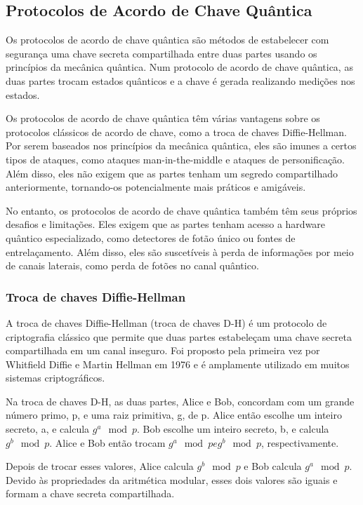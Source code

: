 \subsection{Protocolos de Acordo de Chave Quântica}

Os protocolos de acordo de chave quântica são métodos de estabelecer com segurança uma chave secreta compartilhada entre duas partes usando os princípios da mecânica quântica. Num protocolo de acordo de chave quântica, as duas partes trocam estados quânticos e a chave é gerada realizando medições nos estados.

Os protocolos de acordo de chave quântica têm várias vantagens sobre os protocolos clássicos de acordo de chave, como a troca de chaves Diffie-Hellman. Por serem baseados nos princípios da mecânica quântica, eles são imunes a certos tipos de ataques, como ataques man-in-the-middle e ataques de personificação. Além disso, eles não exigem que as partes tenham um segredo compartilhado anteriormente, tornando-os potencialmente mais práticos e amigáveis.

No entanto, os protocolos de acordo de chave quântica também têm seus próprios desafios e limitações. Eles exigem que as partes tenham acesso a hardware quântico especializado, como detectores de fotão único ou fontes de entrelaçamento. Além disso, eles são suscetíveis à perda de informações por meio de canais laterais, como perda de fotões no canal quântico.

\subsubsection{Troca de chaves Diffie-Hellman}

A troca de chaves Diffie-Hellman (troca de chaves D-H) é um protocolo de criptografia clássico que permite que duas partes estabeleçam uma chave secreta compartilhada em um canal inseguro. Foi proposto pela primeira vez por Whitfield Diffie e Martin Hellman em 1976 e é amplamente utilizado em muitos sistemas criptográficos.

Na troca de chaves D-H, as duas partes, Alice e Bob, concordam com um grande número primo, p, e uma raiz primitiva, g, de p. Alice então escolhe um inteiro secreto, a, e calcula \(g^a \mod p\). Bob escolhe um inteiro secreto, b, e calcula \(g^b \mod p\). Alice e Bob então trocam \(g^a \mod p e g^b \mod p\), respectivamente.

Depois de trocar esses valores, Alice calcula \(g^b \mod p\) e Bob calcula \(g^a \mod p\). Devido às propriedades da aritmética modular, esses dois valores são iguais e formam a chave secreta compartilhada.


